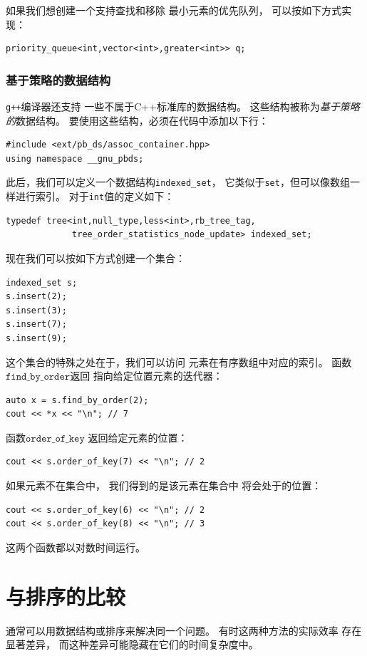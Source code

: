 如果我们想创建一个支持查找和移除
最小元素的优先队列，
可以按如下方式实现：

\begin{lstlisting}
priority_queue<int,vector<int>,greater<int>> q;
\end{lstlisting}

\subsubsection{基于策略的数据结构}

\texttt{g++}编译器还支持
一些不属于C++标准库的数据结构。
这些结构被称为\emph{基于策略的}数据结构。
要使用这些结构，必须在代码中添加以下行：
\begin{lstlisting}
#include <ext/pb_ds/assoc_container.hpp>
using namespace __gnu_pbds; 
\end{lstlisting}
此后，我们可以定义一个数据结构\texttt{indexed\_set}，
它类似于\texttt{set}，但可以像数组一样进行索引。
对于\texttt{int}值的定义如下：
\begin{lstlisting}
typedef tree<int,null_type,less<int>,rb_tree_tag,
             tree_order_statistics_node_update> indexed_set; 
\end{lstlisting}
现在我们可以按如下方式创建一个集合：
\begin{lstlisting}
indexed_set s;
s.insert(2);
s.insert(3);
s.insert(7);
s.insert(9);
\end{lstlisting}
这个集合的特殊之处在于，我们可以访问
元素在有序数组中对应的索引。
函数$\texttt{find\_by\_order}$返回
指向给定位置元素的迭代器：
\begin{lstlisting}
auto x = s.find_by_order(2);
cout << *x << "\n"; // 7
\end{lstlisting}
函数$\texttt{order\_of\_key}$
返回给定元素的位置：
\begin{lstlisting}
cout << s.order_of_key(7) << "\n"; // 2
\end{lstlisting}
如果元素不在集合中，
我们得到的是该元素在集合中
将会处于的位置：
\begin{lstlisting}
cout << s.order_of_key(6) << "\n"; // 2
cout << s.order_of_key(8) << "\n"; // 3
\end{lstlisting}
这两个函数都以对数时间运行。

\section{与排序的比较}

通常可以用数据结构或排序来解决同一个问题。
有时这两种方法的实际效率
存在显著差异，
而这种差异可能隐藏在它们的时间复杂度中。

